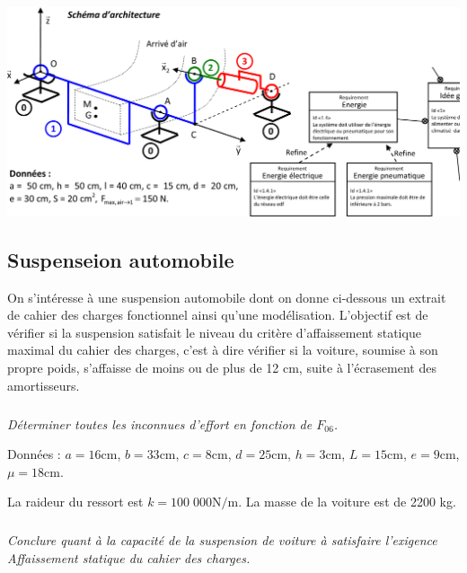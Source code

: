 \documentclass[10pt,fleqn]{article} %
\begin{document}
\begin{center}
\includegraphics[width=.95\linewidth]{images/img2}
\end{center}

\newpage
\begin{multicols}{2}

\subsection*{Suspenseion automobile}
\setcounter{exo}{0}


On s'intéresse à une suspension automobile dont on donne ci-dessous un extrait de cahier des charges fonctionnel ainsi qu’une modélisation. L'objectif est de vérifier si la suspension satisfait le niveau du critère d'affaissement statique maximal du cahier des charges, c'est à dire vérifier si la voiture, soumise à son propre poids, s'affaisse de moins ou de plus de 12 cm, suite à l'écrasement des amortisseurs. 


%
%
%
%
%


\subparagraph{}
\textit{Déterminer toutes les inconnues d'effort en fonction de $F_{06}$.}

Données : $a = 16 \text{cm}$, $b = 33 \text{cm}$, $c = 8 \text{cm}$, $d = 25 \text{cm}$, $h = 3 \text{cm}$, $L = 15 \text{cm}$, $e = 9 \text{cm}$, $\mu = 18 \text{cm}$. 

La raideur du ressort est $k = 100\;000 \text{N/m}$. La masse de la voiture est de 2200 kg.

\subparagraph{}
\textit{Conclure quant à la capacité de la suspension de voiture à satisfaire l’exigence Affaissement statique du cahier des charges. }

\end{multicols}
\end{document}
